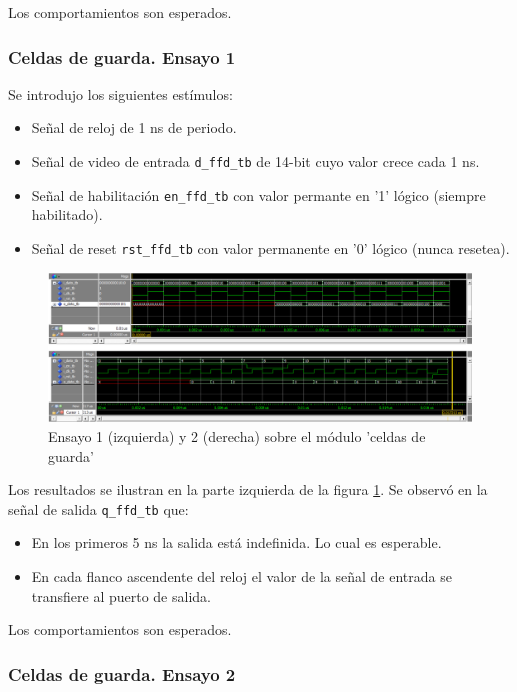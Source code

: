 Los comportamientos son esperados.


\subsubsection{Celdas de guarda. Ensayo 1}

Se introdujo los siguientes estímulos:
\begin{itemize}
\item Señal de reloj de 1 ns de periodo.
\item Señal de video de entrada \texttt{d\_ffd\_tb} de 14-bit cuyo valor crece cada 1 ns.
\item Señal de habilitación \texttt{en\_ffd\_tb} con valor permante en '1' lógico (siempre habilitado).
\item Señal de reset \texttt{rst\_ffd\_tb} con valor permanente en '0' lógico (nunca resetea).
\end{itemize}

\begin{figure}
\centering
\includegraphics[scale=0.85, angle=270]{./Figures/tb_cfar_gc.png}
\caption{Ensayo 1 (izquierda) y 2 (derecha) sobre el módulo 'celdas de guarda'}
\label{tb_cfar_gc}
\end{figure}

Los resultados se ilustran en la parte izquierda de la figura \ref{tb_cfar_gc}. Se observó en la señal de salida \texttt{q\_ffd\_tb} que:

\begin{itemize}
\item En los primeros 5 ns la salida está indefinida. Lo cual es esperable.
\item En cada flanco ascendente del reloj el valor de la señal de entrada se transfiere al puerto de salida.
\end{itemize}

Los comportamientos son esperados.


\subsubsection{Celdas de guarda. Ensayo 2}

